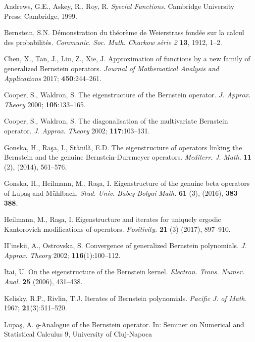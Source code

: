 \documentclass[12pt]{article}
\numberwithin{equation}{section} \theoremstyle{plain}
\theoremstyle{definition}
\theoremstyle{remark}
\begin{document}
\begin{thebibliography}{0}

 Andrews, G.E., Askey, R., Roy, R. 
{\it Special Functions.}
Cambridge University Press: Cambridge, 1999.



 Bernstein, S.N.
D\'{e}monstration du th\'{e}or\`{e}me de Weierstrass fond\'{e}e sur la calcul des probabilit\'{e}s. 
{\it Communic. Soc. Math. Charkow s\'{e}rie 2} {\bf 13}, 1912, 1--2.

 Chen, X., Tan, J., Liu, Z., Xie, J. 
Approximation of functions by a new family of generalized Bernstein operators. 
{\it Journal of Mathematical Analysis and Applications} 2017; {\bf 450}:244--261.

 Cooper, S., Waldron, S. 
The eigenstructure of the Bernstein operator. 
{\it J. Approx. Theory} 2000; {\bf 105}:133--165.

 Cooper, S., Waldron, S. 
The diagonalisation of the multivariate Bernstein operator. 
{\it J. Approx. Theory} 2002; {\bf 117}:103--131.

 Gonska, H., Ra\c{s}a, I., St\v{a}nil\v{a}, E.D. 
The eigenstructure of operators linking the Bernstein and the genuine Bernstein-Durrmeyer operators. 
{\it  Mediterr. J. Math.} {\bf 11} (2), (2014), 561--576.

 Gonska, H., Heilmann, M., Ra\c{s}a, I. 
Eigenstructure of the genuine beta operators of Lupaş and Mühlbach. 
{\it Stud. Univ. Babeş-Bolyai Math.} {\bf 61} (3), (2016), {\bf 383–388}.

 Heilmann, M., Ra\c{s}a, I. 
Eigenstructure and iterates for uniquely ergodic Kantorovich modifications of operators. 
{\it Positivity.} {\bf 21} (3) (2017), 897--910.

 II'inskii, A., Ostrovska, S. 
Convergence of generalized Bernstein polynomials. 
{\it J. Approx. Theory} 2002; {\bf 116}(1):100--112.

 Itai, U. 
On the eigenstructure of the Bernstein kernel. 
{\it Electron. Trans. Numer. Anal.} {\bf 25} (2006), 431--438.

 Kelisky, R.P., Rivlin, T.J. 
Iterates of Bernstein polynomials. 
{\it Pacific J. of Math.} 1967; {\bf 21}(3):511--520.

 Lupa\c{s}, A. 
$q$-Analogue of the Bernstein operator.
In: Seminer on Numerical and Statistical Calculus 9, University of Cluj-Napoca 


\end{thebibliography}
\end{document}
